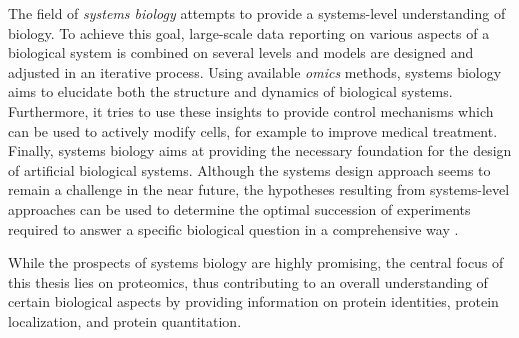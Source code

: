 The field of {\em systems biology} attempts to provide a systems-level 
understanding of biology. 
To achieve this goal, large-scale data reporting on various aspects of a 
biological system is combined on several levels and models are designed and
adjusted in an iterative process.
Using available {\em omics} methods, systems biology aims to elucidate both 
the structure and dynamics of biological systems.
Furthermore, it tries to use these insights to provide control mechanisms which
can be used to actively modify cells, for example to improve medical treatment.
Finally, systems biology aims at providing the necessary foundation for
the design of artificial biological systems.
Although the systems design approach seems to remain a challenge in the near
future, the hypotheses resulting from systems-level approaches can be used
to determine the optimal succession of experiments required to answer a
specific biological question in a comprehensive way \citep{Ideker2000}.

While the prospects of systems biology are highly promising, the central focus
of this thesis lies on proteomics, thus contributing to an overall understanding
of certain biological aspects by providing information on protein identities,
protein localization, and protein quantitation.

